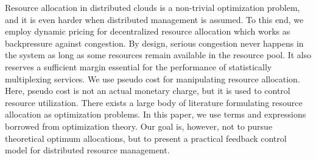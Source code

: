 Resource allocation in distributed clouds is a non-trivial
optimization problem, and it is even harder when distributed
management is assumed.
To this end, we employ dynamic pricing for decentralized resource
allocation which works as backpressure against congestion.
By design, serious congestion never happens in the system as long as
some resources remain available in the resource pool.
It also reserves a sufficient margin essential for the performance of
statistically multiplexing services.
We use pseudo cost for manipulating resource allocation.
Here, pseudo cost is not an actual monetary charge, but it is used to
control resource utilization.
There exists a large body of literature formulating resource allocation
as optimization problems.
In this paper, we use terms and expressions borrowed from optimization
theory. Our goal is, however, not to pursue theoretical optimum
allocations, but to present a practical feedback control model for
distributed resource management.


